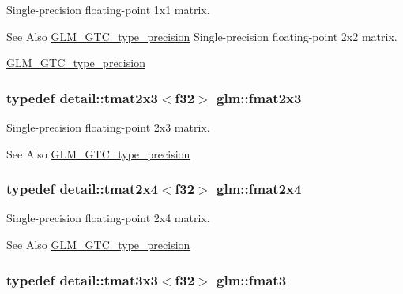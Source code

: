 Single-\/precision floating-\/point 1x1 matrix. 

\begin{DoxySeeAlso}{See Also}
\hyperlink{group__gtc__type__precision}{G\-L\-M\-\_\-\-G\-T\-C\-\_\-type\-\_\-precision} Single-\/precision floating-\/point 2x2 matrix. 

\hyperlink{group__gtc__type__precision}{G\-L\-M\-\_\-\-G\-T\-C\-\_\-type\-\_\-precision} 
\end{DoxySeeAlso}
\hypertarget{group__gtc__type__precision_ga962841878f2520a9ac2859bc2bd467fb}{
\subsubsection[{fmat2x3}]{\setlength{\rightskip}{0pt plus 5cm}typedef detail\-::tmat2x3$<$f32$>$ {\bf glm\-::fmat2x3}}}\label{group__gtc__type__precision_ga962841878f2520a9ac2859bc2bd467fb}


Single-\/precision floating-\/point 2x3 matrix. 

\begin{DoxySeeAlso}{See Also}
\hyperlink{group__gtc__type__precision}{G\-L\-M\-\_\-\-G\-T\-C\-\_\-type\-\_\-precision} 
\end{DoxySeeAlso}
\hypertarget{group__gtc__type__precision_gaf838bceea05a5b2fe2ea7bbb7d582b1a}{
\subsubsection[{fmat2x4}]{\setlength{\rightskip}{0pt plus 5cm}typedef detail\-::tmat2x4$<$f32$>$ {\bf glm\-::fmat2x4}}}\label{group__gtc__type__precision_gaf838bceea05a5b2fe2ea7bbb7d582b1a}


Single-\/precision floating-\/point 2x4 matrix. 

\begin{DoxySeeAlso}{See Also}
\hyperlink{group__gtc__type__precision}{G\-L\-M\-\_\-\-G\-T\-C\-\_\-type\-\_\-precision} 
\end{DoxySeeAlso}
\hypertarget{group__gtc__type__precision_ga97f5385bc271a35cbbff8ac6a420c849}{
\subsubsection[{fmat3}]{\setlength{\rightskip}{0pt plus 5cm}typedef detail\-::tmat3x3$<$f32$>$ {\bf glm\-::fmat3}}}\label{group__gtc__type__precision_ga97f5385bc271a35cbbff8ac6a420c849}


